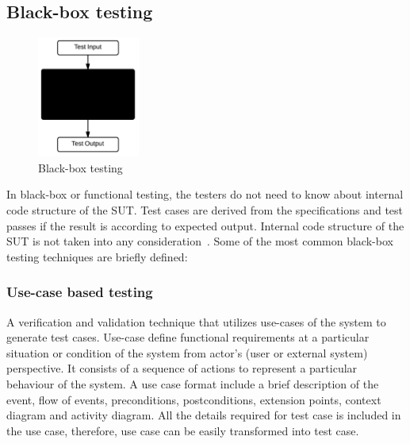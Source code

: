 \subsection{Black-box testing}
\begin{figure}
  \vspace{-35pt}
  \begin{center}
    \includegraphics[width=0.30\textwidth]{chapter2/blackBox.png}
  \end{center}
  \vspace{-20pt}
  \caption{Black-box testing}
  \label{fig:blackBox}
  \vspace{-18pt}
\end{figure}
In black-box or functional testing, the testers do not need to know about internal code structure of the SUT. Test cases are derived from the specifications and test passes if the result is according to expected output. Internal code structure of the SUT is not taken into any consideration~\cite{beizer1995black}. Some of the most common black-box testing techniques are briefly defined:

\subsubsection{Use-case based testing}
A verification and validation technique that utilizes use-cases of the system to generate test cases. Use-case define functional requirements at a particular situation or condition of the system from actor's (user or external system) perspective. It consists of a sequence of actions to represent a particular behaviour of the system. A use case format include a brief description of the event, flow of events, preconditions, postconditions, extension points, context diagram and activity diagram. All the details required for test case is included in the use case, therefore, use case can be easily transformed into test case. 



